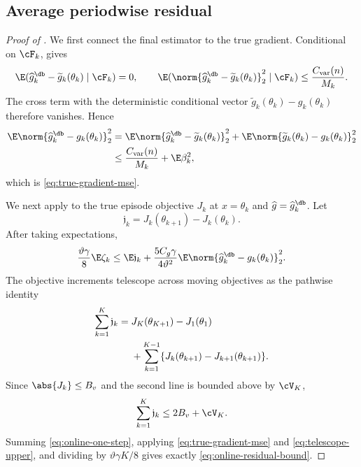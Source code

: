 \subsection{Average periodwise residual}

\begin{proof}[Proof of ]
We first connect the final estimator to the true gradient.  Conditional on $\cF_k$,  gives
\[
 \E(\widehat g_k^{\db}-\widetilde g_k(\theta_k)\mid\cF_k)=0,
 \qquad
 \E(\norm{\widehat g_k^{\db}-\widetilde g_k(\theta_k)}_2^2\mid\cF_k)
 \le\frac{C_{\rm var}(n)}{M_k}.
\]
The cross term with the deterministic conditional vector
$\widetilde g_k(\theta_k)-g_k(\theta_k)$ therefore vanishes.  Hence
\begin{align*}
 \E\norm{\widehat g_k^{\db}-g_k(\theta_k)}_2^2
 &=\E\norm{\widehat g_k^{\db}-\widetilde g_k(\theta_k)}_2^2
 +\E\norm{\widetilde g_k(\theta_k)-g_k(\theta_k)}_2^2\\
 &\le\frac{C_{\rm var}(n)}{M_k}+\E\beta_k^2,
\end{align*}
which is \eqref{eq:true-gradient-mse}.

We next apply  to the true episode objective $J_k$ at $x=\theta_k$ and $\widehat g=\widehat g_k^{\db}$.  Let
\[
 \mathfrak j_k=J_k(\theta_{k+1})-J_k(\theta_k).
\]
After taking expectations,
\begin{equation}\label{eq:online-one-step}
 \frac{\vartheta\gamma}{8}\E\zeta_k
 \le\E \mathfrak j_k
 +\frac{5C_g\gamma}{4\vartheta^2}
 \E\norm{\widehat g_k^{\db}-g_k(\theta_k)}_2^2.
\end{equation}
The objective increments telescope across moving objectives as the pathwise identity
\begin{align}\label{eq:moving-objective-telescope}
 \sum_{k=1}^{K}\mathfrak j_k
 ={}&J_K(\theta_{K+1})-J_1(\theta_1)\notag\\
 &+\sum_{k=1}^{K-1}
 \{J_k(\theta_{k+1})-J_{k+1}(\theta_{k+1})\}.
\end{align}
Since $\abs{J_k}\le B_v$ and the second line is bounded above by $\cV_K$,
\begin{equation}\label{eq:telescope-upper}
 \sum_{k=1}^{K}\mathfrak j_k\le2B_v+\cV_K.
\end{equation}
Summing \eqref{eq:online-one-step}, applying \eqref{eq:true-gradient-mse} and \eqref{eq:telescope-upper}, and dividing by $\vartheta\gamma K/8$ gives exactly \eqref{eq:online-residual-bound}.
\end{proof}

